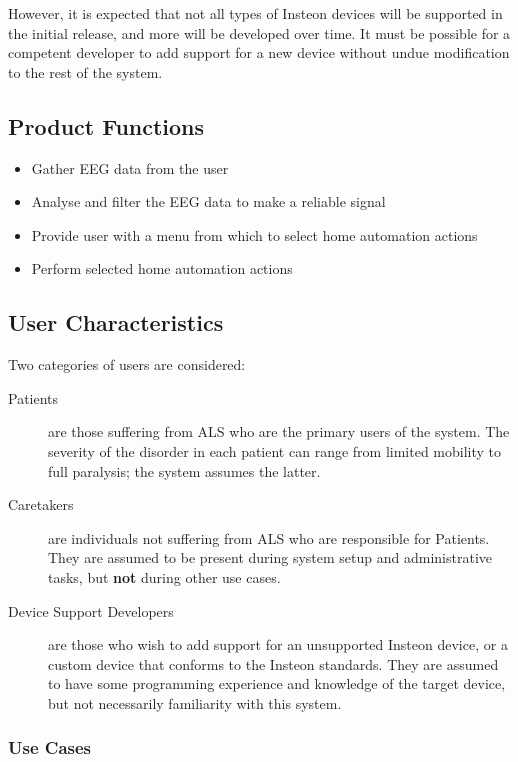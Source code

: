 \documentclass{article}
\begin{document}
However, it is expected that not all types of Insteon devices will be
supported in the initial release, and more will be developed over time. It
must be possible for a competent developer to add support for a new device
without undue modification to the rest of the system.

\subsection{Product Functions}

\begin{itemize}
\item Gather EEG data from the user
\item Analyse and filter the EEG data to make a reliable signal
\item Provide user with a menu from which to select home automation actions
\item Perform selected home automation actions
\end{itemize}

\subsection{User Characteristics}
\label{sec:UserChar}
Two categories of users are considered:

\begin{description}
    \item[Patients] are those suffering from ALS who are the primary users of
        the system. The severity of the disorder in each patient can range
        from limited mobility to full paralysis; the system assumes the
        latter.
    \item[Caretakers] are individuals not suffering from ALS who are
        responsible for Patients. They are assumed to be present during system
        setup and administrative tasks, but \textbf{not} during other use
        cases.
    \item[Device Support Developers] are those who wish to add support for an
        unsupported Insteon device, or a custom device that conforms to the
        Insteon standards. They are assumed to have some programming
        experience and knowledge of the target device, but not necessarily
        familiarity with this system.
\end{description}

\subsubsection{Use Cases}
\end{document}
